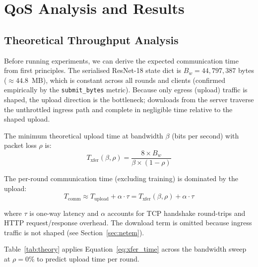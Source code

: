 \documentclass[12pt,a4paper]{report}
\begin{document}
\chapter{QoS Analysis and Results}
\label{ch:qos}

\section{Theoretical Throughput Analysis}
\label{sec:model}

Before running experiments, we can derive the expected communication time
from first principles.  The serialised ResNet-18 state dict is
$B_w = 44{,}797{,}387$ bytes ($\approx 44.8$~MB), which is constant
across all rounds and clients (confirmed empirically by the
\texttt{submit\_bytes} metric).  Because only egress (upload) traffic is
shaped, the upload direction is the bottleneck; downloads from the
server traverse the unthrottled ingress path and complete in negligible
time relative to the shaped upload.

The minimum theoretical upload time at bandwidth $\beta$ (bits per
second) with packet loss $\rho$ is:
\begin{equation}
  T_{\mathrm{xfer}}(\beta, \rho) = \frac{8 \times B_w}{\beta \times (1 - \rho)}
  \label{eq:xfer_time}
\end{equation}

The per-round communication time (excluding training) is dominated by
the upload:
\begin{equation}
  T_{\mathrm{comm}} \approx T_{\mathrm{upload}} + \alpha \cdot \tau
  = T_{\mathrm{xfer}}(\beta, \rho) + \alpha \cdot \tau
  \label{eq:tcomm_applied}
\end{equation}

where $\tau$ is one-way latency and $\alpha$ accounts for TCP handshake
round-trips and HTTP request/response overhead.  The download term is
omitted because ingress traffic is not shaped (see
Section~\ref{sec:netem}).

Table~\ref{tab:theory} applies Equation~\ref{eq:xfer_time} across the
bandwidth sweep at $\rho = 0\%$ to predict upload time per round.
\end{document}
